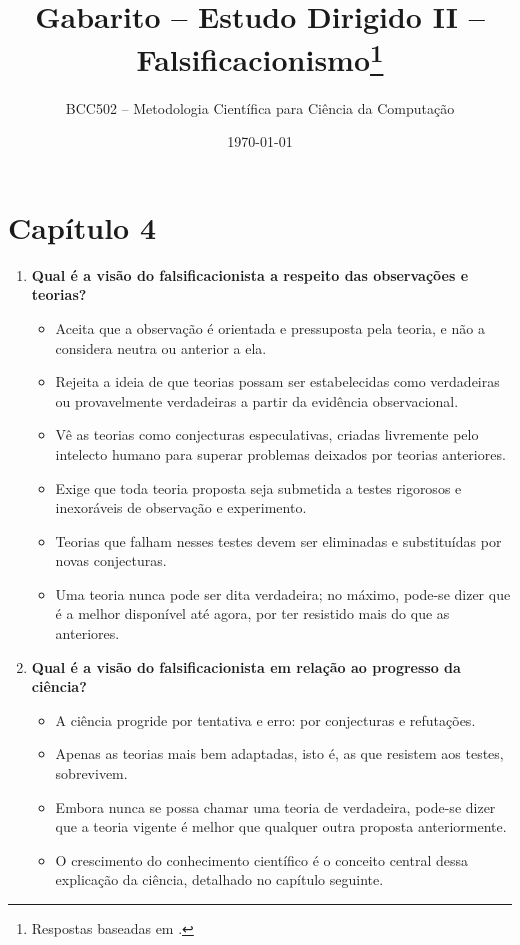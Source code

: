 \documentclass[10pt,a4paper]{extarticle}
\title{Gabarito -- Estudo Dirigido II -- Falsificacionismo\footnote{Respostas baseadas em \citep{chalmers1993}.}}
\author{BCC502 -- Metodologia Científica para Ciência da Computação}
\date{\today}
\begin{document}
\vspace{-1cm}
\maketitle

\section*{Capítulo 4}
\begin{enumerate}[label=\textbf{\arabic*.}, itemsep=10pt]

\item \textbf{Qual é a visão do falsificacionista a respeito das observações e teorias?}
\begin{itemize}
  \item Aceita que a observação é orientada e pressuposta pela teoria, e não a considera neutra ou anterior a ela.
  \item Rejeita a ideia de que teorias possam ser estabelecidas como verdadeiras ou provavelmente verdadeiras a partir da evidência observacional.
  \item Vê as teorias como conjecturas especulativas, criadas livremente pelo intelecto humano para superar problemas deixados por teorias anteriores.
  \item Exige que toda teoria proposta seja submetida a testes rigorosos e inexoráveis de observação e experimento.
  \item Teorias que falham nesses testes devem ser eliminadas e substituídas por novas conjecturas.
  \item Uma teoria nunca pode ser dita verdadeira; no máximo, pode-se dizer que é a melhor disponível até agora, por ter resistido mais do que as anteriores.
\end{itemize}

\item \textbf{Qual é a visão do falsificacionista em relação ao progresso da ciência?}
\begin{itemize}
  \item A ciência progride por tentativa e erro: por conjecturas e refutações.
  \item Apenas as teorias mais bem adaptadas, isto é, as que resistem aos testes, sobrevivem.
  \item Embora nunca se possa chamar uma teoria de verdadeira, pode-se dizer que a teoria vigente é melhor que qualquer outra proposta anteriormente.
  \item O crescimento do conhecimento científico é o conceito central dessa explicação da ciência, detalhado no capítulo seguinte.
\end{itemize}


\end{enumerate}
\end{document}
